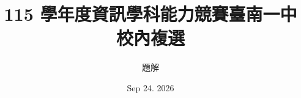 

\title{115 學年度資訊學科能力競賽臺南一中校內複選}
\author{題解}
\date{Sep 24. 2026}



\begin{frame}
\vspace{-1.6em}
\titlepage
\end{frame}












